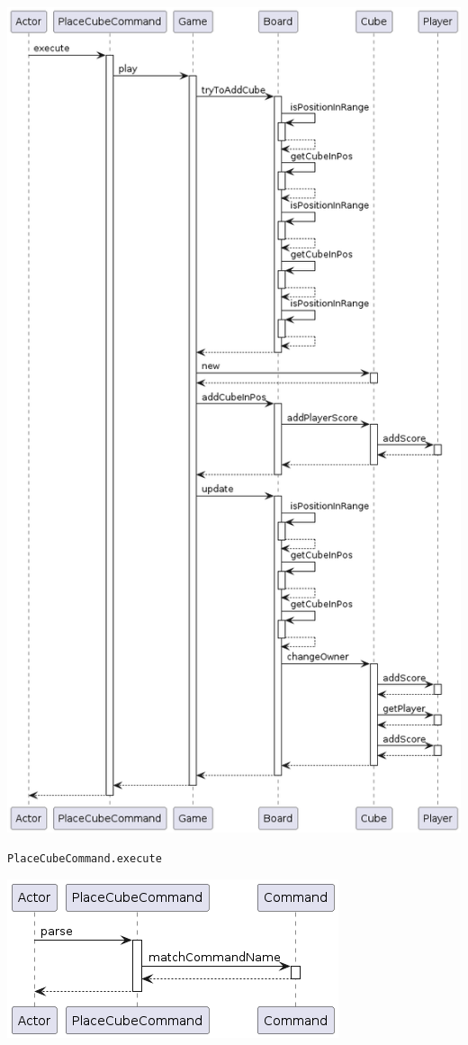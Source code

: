 \documentclass[../DocumentoOficial.tex]{subfiles}
\begin{document}
\begin{sprint}[2]
\begin{center}
\end{center}
\begin{center}
\includegraphics[scale=0.5]{PlaceCubeCommand_execute_sprint2.png}

\texttt{PlaceCubeCommand.execute}
\end{center}
\begin{center}
\includegraphics[scale=0.5]{PlaceCubeCommand_parse.png}


\end{center}
\end{sprint}
\end{document}
